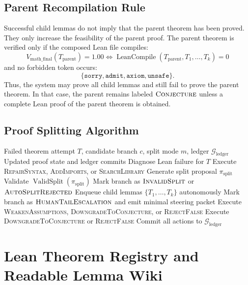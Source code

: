 \documentclass[11pt]{article}
\begin{document}
\subsection{Parent Recompilation Rule}
Successful child lemmas do not imply that the parent theorem has been proved. They only increase the feasibility of the parent proof. The parent theorem is verified only if the composed Lean file compiles:
$$
V_{\text{math\_final}}(T_{\text{parent}})=1.00
\Longleftrightarrow
\operatorname{LeanCompile}(T_{\text{parent}},T_1,\dots,T_k)=0
$$
and no forbidden token occurs:
$$
\{\texttt{sorry},\texttt{admit},\texttt{axiom},\texttt{unsafe}\}.
$$
Thus, the system may prove all child lemmas and still fail to prove the parent theorem. In that case, the parent remains labeled $\textsc{Conjecture}$ unless a complete Lean proof of the parent theorem is obtained.

\subsection{Proof Splitting Algorithm}
\begin{algorithm}[H]
\caption{Bounded Auto Proof Splitting}
\begin{algorithmic}[1]
\Require Failed theorem attempt $T$, candidate branch $c$, split mode $m$, ledger $\mathcal{G}_{\text{ledger}}$
\Ensure Updated proof state and ledger commits
\State Diagnose Lean failure for $T$
\State Execute \textsc{RepairSyntax}, \textsc{AddImports}, or \textsc{SearchLibrary}
\State Generate split proposal $\pi_{\text{split}}$
\State Validate $\operatorname{ValidSplit}(\pi_{\text{split}})$
\State Mark branch as $\textsc{InvalidSplit}$ or $\textsc{AutoSplitRejected}$
\State Enqueue child lemmas $\{T_1,\dots,T_k\}$ autonomously
\State Mark branch as $\textsc{HumanTailEscalation}$ and emit minimal steering packet
\Else
\State Execute \textsc{WeakenAssumptions}, \textsc{DowngradeToConjecture}, or \textsc{RejectFalse}
\EndIf
\Else
\State Execute \textsc{DowngradeToConjecture} or \textsc{RejectFalse}
\EndIf
\State Commit all actions to $\mathcal{G}_{\text{ledger}}$
\end{algorithmic}
\end{algorithm}

\section{Lean Theorem Registry and Readable Lemma Wiki}
\end{document}
